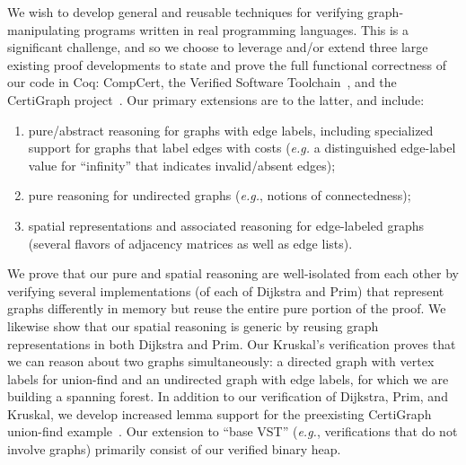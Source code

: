 We wish to develop general and reusable techniques for verifying graph-manipulating programs written in real programming languages.  This is a significant challenge, and so we choose to leverage and/or extend three large existing proof developments to state and prove the full functional correctness of our code in Coq: CompCert, the Verified Software Toolchain~\cite{appel:programlogics}, and the CertiGraph project~\cite{DBLP:journals/pacmpl/WangCMH19}.  Our primary extensions are to the latter, and include:
\begin{enumerate}
\item pure/abstract reasoning for graphs with edge labels, including specialized support for graphs that label edges with costs (\emph{e.g.} a distinguished edge-label value for ``infinity'' that indicates invalid/absent edges);
\item pure reasoning for undirected graphs (\emph{e.g.}, notions of connectedness);
\item spatial representations and associated reasoning for edge-labeled graphs (several flavors of adjacency matrices as well as edge lists).
\end{enumerate}
We prove that our pure and spatial reasoning are well-isolated from each other by verifying several implementations (of each of Dijkstra and Prim) that represent graphs differently in memory but reuse the entire pure portion of the proof.  We likewise show that our spatial reasoning is generic by reusing graph representations in both Dijkstra and Prim.  Our Kruskal's verification proves that we can reason about two graphs simultaneously: a directed graph with vertex labels for union-find and an undirected graph with edge labels, for which we are building a spanning forest.
In addition to our verification of Dijkstra, Prim, and Kruskal, we develop increased lemma support for the preexisting CertiGraph union-find example~\cite{DBLP:journals/pacmpl/WangCMH19}.  Our extension to ``base VST'' (\emph{e.g.}, verifications that do not involve graphs) primarily consist of our verified binary heap.




